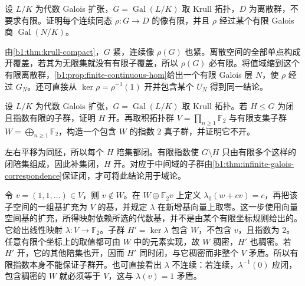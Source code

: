 \begin{exercise}\label{b1:ex:22-8}
	设 \(L/K\) 为代数 Galois 扩张，\(G=\operatorname{Gal}(L/K)\) 取 Krull 拓扑，\(D\) 为离散群，不要求有限。证明每个连续同态 \(\rho:G\rightarrow D\) 的像有限，并且 \(\rho\) 经过某个有限 Galois 商 \(\operatorname{Gal}(N/K)\)。
\end{exercise}
\begin{solution}
	由\cref{b1:thm:krull-compact}，\(G\) 紧，连续像 \(\rho(G)\) 也紧。离散空间的全部单点构成开覆盖，若其为无限集就没有有限子覆盖，所以 \(\rho(G)\) 必有限。将值域缩到这个有限离散群，\cref{b1:prop:finite-continuous-hom}给出一个有限 Galois 层 \(N\)，使 \(\rho\) 经过 \(G_N\)。还可直接从 \(\ker\rho=\rho^{-1}(1)\) 开并包含某个 \(U_N\) 得到同一结论。
\end{solution}

\begin{exercise}\label{b1:ex:22-9}
	设 \(L/K\) 为代数 Galois 扩张，\(G=\operatorname{Gal}(L/K)\) 取 Krull 拓扑。若 \(H\leq G\) 为闭且指数有限的子群，证明 \(H\) 开。再取积拓扑群 \(V=\prod_{n\geq1}\mathbb F_2\) 与有限支集子群 \(W=\bigoplus_{n\geq1}\mathbb F_2\)，构造一个包含 \(W\) 的指数 \(2\) 真子群，并证明它不开。
\end{exercise}
\begin{solution}
	左右平移为同胚，所以每个 \(H\) 陪集都闭。有限指数使 \(G\setminus H\) 只由有限多个这样的闭陪集组成，因此补集闭，\(H\) 开。对应于中间域的子群由\cref{b1:thm:infinite-galois-correspondence}保证闭，才可将此结论用于域论。

	令 \(v=(1,1,\ldots)\in V\)，则 \(v\notin W\)。在 \(W\oplus\mathbb F_2v\) 上定义 \(\lambda_0(w+cv)=c\)，再把该子空间的一组基扩充为 \(V\) 的基，并规定 \(\lambda\) 在新增基向量上取零。这一步使用向量空间基的扩充，所得映射依赖所选的代数基，并不是由某个有限坐标规则给出的。它给出线性映射 \(\lambda:V\to\mathbb F_2\)。子群 \(H'=\ker\lambda\) 包含 \(W\)，不包含 \(v\)，且指数为 \(2\)。任意有限个坐标上的取值都可由 \(W\) 中的元素实现，故 \(W\) 稠密，\(H'\) 也稠密。若 \(H'\) 开，它的其他陪集也开，因而 \(H'\) 同时闭，与它稠密而非整个 \(V\) 矛盾。所以有限指数本身不能保证子群开。也可直接看出 \(\lambda\) 不连续：若连续，\(\lambda^{-1}(0)\) 应闭，包含稠密的 \(W\) 就必须等于 \(V\)，这与 \(\lambda(v)=1\) 矛盾。
\end{solution}

